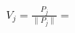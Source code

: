 \documentclass[preview]{standalone}
\begin{document}
\begin{align*}
V_j=\frac{P_j}{\|P_j\|}=
\end{align*}
\end{document}

